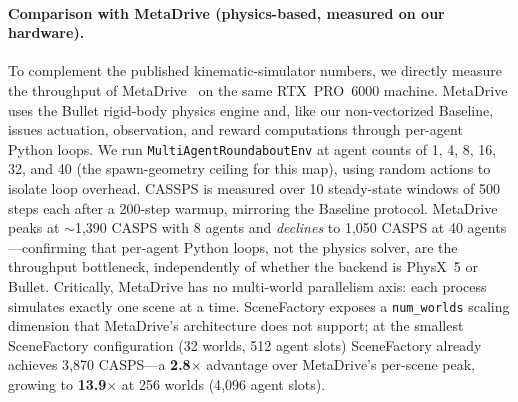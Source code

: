 \paragraph{Comparison with MetaDrive (physics-based, measured on our hardware).}
To complement the published kinematic-simulator numbers, we directly measure the throughput of MetaDrive~\cite{li2022metadrive} on the same RTX~PRO~6000 machine.
MetaDrive uses the Bullet rigid-body physics engine and, like our non-vectorized Baseline, issues actuation, observation, and reward computations through per-agent Python loops.
We run \texttt{MultiAgentRoundaboutEnv} at agent counts of 1, 4, 8, 16, 32, and 40 (the spawn-geometry ceiling for this map), using random actions to isolate loop overhead.
CASSPS is measured over 10 steady-state windows of 500 steps each after a 200-step warmup, mirroring the Baseline protocol.
MetaDrive peaks at $\sim$1{,}390 CASPS with 8 agents and \emph{declines} to 1{,}050 CASPS at 40 agents---confirming that per-agent Python loops, not the physics solver, are the throughput bottleneck, independently of whether the backend is PhysX~5 or Bullet.
Critically, MetaDrive has no multi-world parallelism axis: each process simulates exactly one scene at a time.
SceneFactory exposes a \texttt{num\_worlds} scaling dimension that MetaDrive's architecture does not support; at the smallest SceneFactory configuration (32 worlds, 512 agent slots) SceneFactory already achieves 3{,}870 CASPS---a \textbf{2.8$\times$} advantage over MetaDrive's per-scene peak, growing to \textbf{13.9$\times$} at 256 worlds (4{,}096 agent slots).

